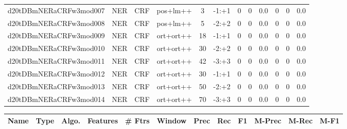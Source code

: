 \documentclass[a4paper]{article}
\begin{document}
\begin{landscape}
\begin{center}
\begin{tabular}{ |c|c|c|c|c|c|c|c|c|c|c|c|}
 
 	
 	\small{ d20tDBmNERaCRFw3mod007 } & \small{ NER} & \small{  CRF }  & pos+lm++  &  3 &  \small{  -1:+1 }  &  0 & 0 & 0.0  &  0 & 0 & 0.0 \\
 	

 
 	
 	\small{ d20tDBmNERaCRFw3mod008 } & \small{ NER} & \small{  CRF }  & pos+lm++  &  5 &  \small{  -2:+2 }  &  0 & 0 & 0.0  &  0 & 0 & 0.0 \\
 	

 
 	
 	\small{ d20tDBmNERaCRFw3mod009 } & \small{ NER} & \small{  CRF }  & ort+ort++  &  18 &  \small{  -1:+1 }  &  0 & 0 & 0.0  &  0 & 0 & 0.0 \\
 	

 
 	
 	\small{ d20tDBmNERaCRFw3mod010 } & \small{ NER} & \small{  CRF }  & ort+ort++  &  30 &  \small{  -2:+2 }  &  0 & 0 & 0.0  &  0 & 0 & 0.0 \\
 	

 
 	
 	\small{ d20tDBmNERaCRFw3mod011 } & \small{ NER} & \small{  CRF }  & ort+ort++  &  42 &  \small{  -3:+3 }  &  0 & 0 & 0.0  &  0 & 0 & 0.0 \\
 	

 
 	
 	\small{ d20tDBmNERaCRFw3mod012 } & \small{ NER} & \small{  CRF }  & ort+ort++  &  30 &  \small{  -1:+1 }  &  0 & 0 & 0.0  &  0 & 0 & 0.0 \\
 	

 
 	
 	\small{ d20tDBmNERaCRFw3mod013 } & \small{ NER} & \small{  CRF }  & ort+ort++  &  50 &  \small{  -2:+2 }  &  0 & 0 & 0.0  &  0 & 0 & 0.0 \\
 	

 
 	
 	\small{ d20tDBmNERaCRFw3mod014 } & \small{ NER} & \small{  CRF }  & ort+ort++  &  70 &  \small{  -3:+3 }  &  0 & 0 & 0.0  &  0 & 0 & 0.0 \\
 	
 \hline
\end{tabular}
\end{center}




\begin{center}
\begin{tabular}{ |c|c|c|c|c|c|c|c|c|c|c|c|} 
 \hline
 	Name & Type & Algo. & Features & \# Ftrs & Window & Prec & Rec & F1 & M-Prec & M-Rec & M-F1\\
 \hline


\end{tabular}
\end{center}
\end{landscape}
\end{document}
